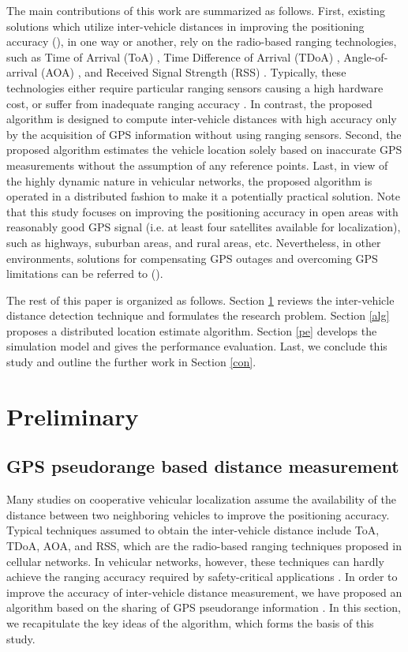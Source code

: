 \documentclass[letterpaper, 10 pt, conference]{ieeeconf}
\begin{document}
The main contributions of this work are summarized as follows. First, existing solutions which utilize inter-vehicle distances in improving the positioning accuracy (\cite{parker2006vehicle, ?apkun2002gps, drawil2008vehicular, parker2007cooperative}), in one way or another, rely on the radio-based ranging technologies, such as Time of Arrival (ToA) \cite{ouyang2010gps}, Time Difference of Arrival (TDoA) \cite{bard1999time}, Angle-of-arrival (AOA) \cite{rong2006angle}, and  Received Signal Strength (RSS) \cite{parker2007vehicular}. Typically, these technologies either require particular ranging sensors causing a high hardware cost, or suffer from inadequate ranging accuracy  \cite{alam2010positioning}. In contrast, the proposed algorithm is designed to compute  inter-vehicle distances with high accuracy only by the acquisition of GPS information without using ranging sensors. Second, the proposed algorithm estimates the vehicle location solely based on inaccurate GPS measurements without the assumption of any reference points. Last, in view of the highly dynamic nature in vehicular networks, the proposed algorithm is operated in a distributed fashion to make it a potentially practical solution. Note that this study focuses on improving the positioning accuracy in open areas with reasonably good GPS signal (i.e. at least four satellites available for localization), such as highways, suburban areas, and rural areas, etc. Nevertheless, in other environments,  solutions for compensating GPS outages and overcoming GPS limitations can be referred to (\cite{parker2006vehicle, ?apkun2002gps, drawil2008vehicular, drawil2009toward}).

The rest of this paper is organized as follows. Section \ref{pre} reviews the inter-vehicle distance detection technique and formulates the research problem. Section \ref{alg}  proposes a distributed location estimate algorithm. Section \ref{pe} develops the simulation model and gives the performance evaluation. Last, we conclude this study and outline the further work in Section \ref{con}.

\section{Preliminary}\label{pre}
\subsection{GPS pseudorange based distance measurement}
Many studies on cooperative vehicular localization assume the availability of the distance between two neighboring vehicles to improve the positioning accuracy. Typical techniques assumed to obtain the inter-vehicle distance include ToA, TDoA, AOA, and RSS, which are the radio-based ranging techniques proposed in cellular networks. In vehicular networks, however, these techniques can hardly achieve the ranging accuracy required by  safety-critical applications \cite{alam2010positioning}. In order to improve the accuracy of inter-vehicle distance measurement, we have proposed an algorithm based on the sharing of GPS pseudorange information \cite{yang2012vehicle}. In this section, we recapitulate the key ideas of the algorithm, which forms the basis of this study.
\end{document}
